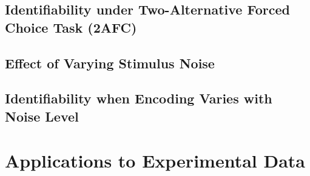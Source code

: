 \documentclass{article}
\begin{document}
\subsection{Identifiability under Two-Alternative Forced Choice Task (2AFC)}



\subsection{Effect of Varying Stimulus Noise}\label{sec:stimulus-noise}



\subsection{Identifiability when Encoding Varies with Noise Level}




\section{Applications to Experimental Data}





\clearpage
\end{document}
